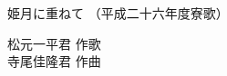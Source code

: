 \documentclass[10pt,b5j]{tarticle} %
\begin{document}
\begin{minipage}[c]{0.7\hsize} %
    \begin{center}
        {\LARGE
            姫月に重ねて %
        }
        {\small 
            （平成二十六年度寮歌） %
        }
    \end{center}
\end{minipage}
\begin{minipage}[c]{0.3\hsize} %
    \begin{flushright} %
        松元一平君 作歌\\寺尾佳隆君 作曲 %
    \end{flushright}
\end{minipage}
\end{document}
